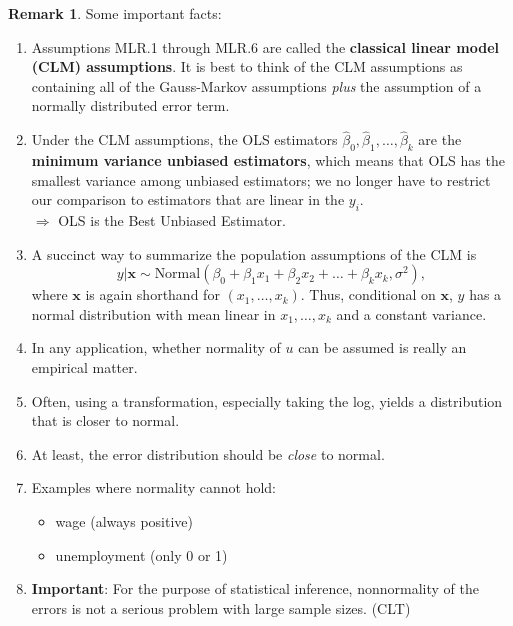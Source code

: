 \documentclass[a4paper, 10pt]{article}
\theoremstyle{definition}	%
\newtheorem*{remark}{Remark}
\begin{document}
\begin{remark} Some important facts:
    \begin{enumerate}
        \item Assumptions MLR.1 through MLR.6 are called the \textbf{classical linear model (CLM) assumptions}. It is best to think of the CLM assumptions as containing all of the Gauss-Markov assumptions \textit{plus} the assumption of a normally distributed error term.
        \item Under the CLM assumptions, the OLS estimators $\hat{\beta}_0, \hat{\beta}_1, \dots, \hat{\beta}_k$ are the \textbf{minimum variance unbiased estimators}, which means that OLS has the smallest variance among unbiased estimators; we no longer have to restrict our comparison to estimators that are linear in the $y_i$. \\
        $\Rightarrow$ OLS is the Best Unbiased Estimator.
        \item A succinct way to summarize the population assumptions of the CLM is
        \begin{equation*}
            y | \mathbf{x} \sim \text{Normal}(\beta_0 + \beta_1 x_1 + \beta_2 x_2 + \dots + \beta_k x_k, \sigma^2),
        \end{equation*}
        where $\mathbf{x}$ is again shorthand for $(x_1, \dots, x_k)$. Thus, conditional on $\mathbf{x}$, $y$ has a normal distribution with mean linear in $x_1, \dots, x_k$ and a constant variance.
        \item In any application, whether normality of $u$ can be assumed is really an empirical matter.
        \item Often, using a transformation, especially taking the log, yields a distribution that is closer to normal.
        \item At least, the error distribution should be \textit{close} to normal.
        \item Examples where normality cannot hold:
        \begin{itemize}
            \item wage (always positive)
            \item unemployment (only 0 or 1)
        \end{itemize}
        \item \textbf{Important}: For the purpose of statistical inference, nonnormality of the errors is not a serious problem with large sample sizes. (CLT)
    \end{enumerate}
\end{remark}
\end{document}
